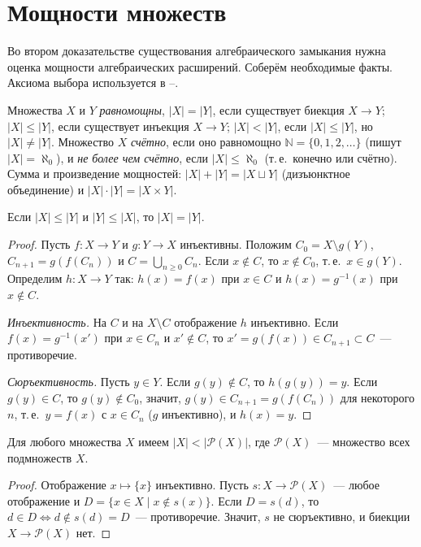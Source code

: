 \section{Мощности множеств}

Во втором доказательстве существования алгебраического замыкания нужна оценка мощности алгебраических расширений.
Соберём необходимые факты. Аксиома выбора используется в --.

\begin{definition}[6.4b]
Множества $X$ и $Y$ \emph{равномощны}, $|X|=|Y|$, если существует биекция $X\to Y$; $|X|\le|Y|$, если существует
инъекция $X\to Y$; $|X|<|Y|$, если $|X|\le|Y|$, но $|X|\ne|Y|$. Множество $X$ \emph{счётно}, если оно равномощно
$\mathbb N=\{0,1,2,\dots\}$ (пишут $|X|=\aleph_0$), и \emph{не более чем счётно}, если $|X|\le\aleph_0$ (т.\,е.\ конечно или
счётно). Сумма и произведение мощностей: $|X|+|Y|=|X\sqcup Y|$ (дизъюнктное объединение) и
$|X|\cdot|Y|=|X\times Y|$.
\end{definition}

\begin{theorem}
Если $|X|\le|Y|$ и $|Y|\le|X|$, то $|X|=|Y|$.
\end{theorem}

\begin{proof}
Пусть $f\colon X\to Y$ и $g\colon Y\to X$ инъективны. Положим $C_0=X\setminus g(Y)$, $C_{n+1}=g(f(C_n))$ и
$C=\bigcup_{n\ge0}C_n$. Если $x\notin C$, то $x\notin C_0$, т.\,е.\ $x\in g(Y)$. Определим $h\colon X\to Y$ так:
$h(x)=f(x)$ при $x\in C$ и $h(x)=g^{-1}(x)$ при $x\notin C$.

\emph{Инъективность.} На $C$ и на $X\setminus C$ отображение $h$ инъективно. Если $f(x)=g^{-1}(x')$ при $x\in C_n$ и
$x'\notin C$, то $x'=g(f(x))\in C_{n+1}\subset C$~--- противоречие.

\emph{Сюръективность.} Пусть $y\in Y$. Если $g(y)\notin C$, то $h(g(y))=y$. Если $g(y)\in C$, то $g(y)\notin C_0$,
значит, $g(y)\in C_{n+1}=g(f(C_n))$ для некоторого $n$, т.\,е.\ $y=f(x)$ с $x\in C_n$ ($g$ инъективно), и $h(x)=y$.
\end{proof}

\begin{theorem}[6.4d: Кантор]
Для любого множества $X$ имеем $|X|<|\mathcal P(X)|$, где $\mathcal P(X)$~--- множество всех подмножеств $X$.
\end{theorem}

\begin{proof}
Отображение $x\mapsto\{x\}$ инъективно. Пусть $s\colon X\to\mathcal P(X)$~--- любое отображение и
$D=\{x\in X\mid x\notin s(x)\}$. Если $D=s(d)$, то $d\in D\iff d\notin s(d)=D$~--- противоречие. Значит, $s$ не
сюръективно, и биекции $X\to\mathcal P(X)$ нет.
\end{proof}

